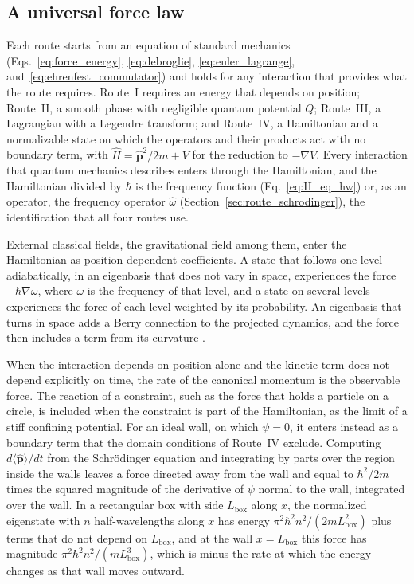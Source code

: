 \documentclass[aps,prd,onecolumn,tightenlines,nofootinbib,notitlepage,11pt,floatfix]{revtex4-2}
\theoremstyle{indentedtheorem}
\begin{document}
\subsection{A universal force law}
\label{sec:universal_law}

Each route starts from an equation of standard mechanics (Eqs.~\eqref{eq:force_energy}, \eqref{eq:debroglie}, \eqref{eq:euler_lagrange}, and~\eqref{eq:ehrenfest_commutator}) and holds for any interaction that provides what the route requires. Route~I requires an energy that depends on position; Route~II, a smooth phase with negligible quantum potential $Q$; Route~III, a Lagrangian with a Legendre transform; and Route~IV, a Hamiltonian and a normalizable state on which the operators and their products act with no boundary term, with $\hat{H}=\hat{\mathbf{p}}^2/2m+V$ for the reduction to $-\nabla V$. Every interaction that quantum mechanics describes enters through the Hamiltonian, and the Hamiltonian divided by $\hbar$ is the frequency function (Eq.~\eqref{eq:H_eq_hw}) or, as an operator, the frequency operator $\hat{\omega}$ (Section~\ref{sec:route_schrodinger}), the identification that all four routes use.

External classical fields, the gravitational field among them, enter the Hamiltonian as position-dependent coefficients. A state that follows one level adiabatically, in an eigenbasis that does not vary in space, experiences the force $-\hbar\nabla\omega$, where $\omega$ is the frequency of that level, and a state on several levels experiences the force of each level weighted by its probability. An eigenbasis that turns in space adds a Berry connection to the projected dynamics, and the force then includes a term from its curvature \citep{Berry1984Quantal,Sundaram1999Wave}.

When the interaction depends on position alone and the kinetic term does not depend explicitly on time, the rate of the canonical momentum is the observable force. The reaction of a constraint, such as the force that holds a particle on a circle, is included when the constraint is part of the Hamiltonian, as the limit of a stiff confining potential. For an ideal wall, on which $\psi=0$, it enters instead as a boundary term that the domain conditions of Route~IV exclude. Computing $d\langle\hat{\mathbf p}\rangle/dt$ from the Schr\"odinger equation and integrating by parts over the region inside the walls leaves a force directed away from the wall and equal to $\hbar^2/2m$ times the squared magnitude of the derivative of $\psi$ normal to the wall, integrated over the wall. In a rectangular box with side $L_\text{box}$ along $x$, the normalized eigenstate with $n$ half-wavelengths along $x$ has energy $\pi^2\hbar^2n^2/(2mL_\text{box}^2)$ plus terms that do not depend on $L_\text{box}$, and at the wall $x=L_\text{box}$ this force has magnitude $\pi^2\hbar^2n^2/(mL_\text{box}^3)$, which is minus the rate at which the energy changes as that wall moves outward.
\end{document}

